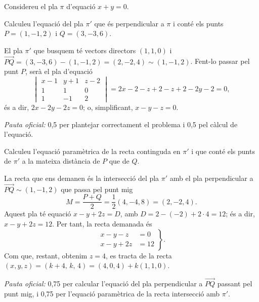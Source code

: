 Considereu el pla $\pi$ d'equació $x+y=0$.

\begin{apartats}

Calculeu l'equació del pla $\pi'$ que és perpendicular a $\pi$ i conté els punts $P=(1,-1,2)$ i
$Q=(3,-3,6)$.

\begin{solucio}
El pla $\pi'$ que busquem té vectors directors $(1,1,0)$ i
$\overrightarrow{PQ}=(3,-3,6)-(1,-1,2)=(2,-2,4)\sim(1,-1,2)$. Fent-lo passar pel punt $P$, serà el pla d'equació
\[
\begin{vmatrix}x-1&y+1&z-2\\1&1&0\\1&-1&2\end{vmatrix}=2x-2-z+2-z+2-2y-2=0,
\]
és a dir, $2x-2y-2z=0$; o, simplificant, $x-y-z=0$.

\textit{Pauta oficial:} 0,5 per plantejar correctament el problema i 0,5 pel càlcul de l'equació.
\end{solucio}

Calculeu l'equació paramètrica de la recta continguda en $\pi'$ i que conté els punts de $\pi'$ a la mateixa
distància de $P$ que de $Q$.

\begin{solucio}
La recta que ens demanen és la intersecció del pla $\pi'$ amb el pla perpendicular a
$\overrightarrow{PQ}\sim(1,-1,2)$ que passa pel punt mig
\[
M=\frac{P+Q}{2}=\frac12(4,-4,8)=(2,-2,4).
\]
Aquest pla té equació $x-y+2z=D$, amb $D=2-(-2)+2\cdot4=12$; és a dir, $x-y+2z=12$. Per tant, la recta
demanada és
\[
\left.\begin{aligned}x-y-z&=0\\x-y+2z&=12\end{aligned}\right\}.
\]
Com que, restant, obtenim $z=4$, es tracta de la recta $(x,y,z)=(k+4,\,k,\,4)=(4,0,4)+k(1,1,0)$.

\textit{Pauta oficial:} 0,75 per calcular l'equació del pla perpendicular a $\overrightarrow{PQ}$ passant pel punt
mig, i 0,75 per l'equació paramètrica de la recta intersecció amb $\pi'$.
\end{solucio}

\end{apartats}
